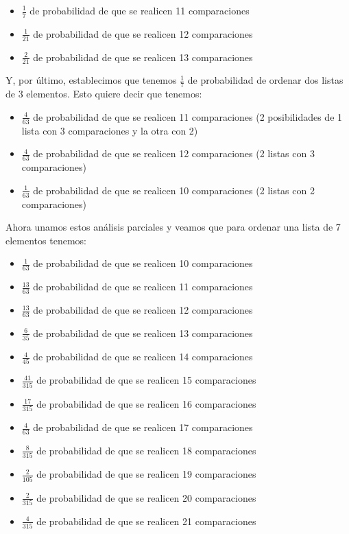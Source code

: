 \documentclass[11pt]{article}
\begin{document}
\begin{itemize}
    \item $\frac{1}{7}$ de probabilidad de que se realicen 11 comparaciones
    \item $\frac{1}{21}$ de probabilidad de que se realicen 12 comparaciones
    \item $\frac{2}{21}$ de probabilidad de que se realicen 13 comparaciones
\end{itemize}

Y, por último, establecimos que tenemos $\frac{1}{7}$ de probabilidad de ordenar dos listas de 3 elementos. Esto quiere decir que tenemos:

\begin{itemize}
    \item $\frac{4}{63}$ de probabilidad de que se realicen 11 comparaciones (2 posibilidades de 1 lista con 3 comparaciones y la otra con 2)
    \item $\frac{4}{63}$ de probabilidad de que se realicen 12 comparaciones (2 listas con 3 comparaciones)
    \item $\frac{1}{63}$ de probabilidad de que se realicen 10 comparaciones (2 listas con 2 comparaciones)
\end{itemize}

Ahora unamos estos análisis parciales y veamos que para ordenar una lista de 7 elementos tenemos: 

\begin{itemize}
    \item $\frac{1}{63}$ de probabilidad de que se realicen 10 comparaciones
    \item $\frac{13}{63}$ de probabilidad de que se realicen 11 comparaciones
    \item $\frac{13}{63}$ de probabilidad de que se realicen 12 comparaciones
    \item $\frac{6}{35}$ de probabilidad de que se realicen 13 comparaciones
    \item $\frac{4}{45}$ de probabilidad de que se realicen 14 comparaciones
    \item $\frac{41}{315}$ de probabilidad de que se realicen 15 comparaciones
    \item $\frac{17}{315}$ de probabilidad de que se realicen 16 comparaciones
    \item $\frac{4}{63}$ de probabilidad de que se realicen 17 comparaciones
    \item $\frac{8}{315}$ de probabilidad de que se realicen 18 comparaciones
    \item $\frac{2}{105}$ de probabilidad de que se realicen 19 comparaciones
    \item $\frac{2}{315}$ de probabilidad de que se realicen 20 comparaciones
    \item $\frac{4}{315}$ de probabilidad de que se realicen 21 comparaciones
\end{itemize}
\end{document}
